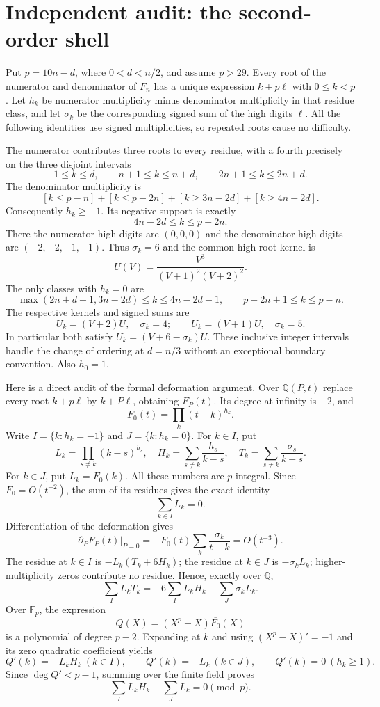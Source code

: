 \section*{Independent audit: the second-order shell}
Put $p=10n-d$, where $0<d<n/2$, and assume $p>29$.
Every root of the numerator and denominator of $F_n$ has a unique
expression $k+p\ell$ with $0\leq k<p$.  Let $h_k$ be numerator
multiplicity minus denominator multiplicity in that residue class, and
let $\sigma_k$ be the corresponding signed sum of the high digits $\ell$.
All the following identities use signed multiplicities, so repeated roots
cause no difficulty.

The numerator contributes three roots to every residue, with a fourth
precisely on the three disjoint intervals
\[
 1\leq k\leq d,\qquad n+1\leq k\leq n+d,
 \qquad 2n+1\leq k\leq2n+d.
\]
The denominator multiplicity is
\[
 [k\leq p-n]+[k\leq p-2n]
 +[k\geq3n-2d]+[k\geq4n-2d].
\]
Consequently $h_k\geq-1$.  Its negative support is exactly
\[
 4n-2d\leq k\leq p-2n.
\]
There the numerator high digits are $(0,0,0)$ and the denominator high
digits are $(-2,-2,-1,-1)$.  Thus $\sigma_k=6$ and the common high-root
kernel is
\[
 U(V)=\frac{V^3}{(V+1)^2(V+2)^2}.
\]
The only classes with $h_k=0$ are
\[
 \max(2n+d+1,3n-2d)\leq k\leq4n-2d-1,
 \qquad p-2n+1\leq k\leq p-n.
\]
The respective kernels and signed sums are
\[
 U_k=(V+2)U,\quad\sigma_k=4;
 \qquad U_k=(V+1)U,\quad\sigma_k=5.
\]
In particular both satisfy $U_k=(V+6-\sigma_k)U$.
These inclusive integer intervals handle the change of ordering at
$d=n/3$ without an exceptional boundary convention.  Also $h_0=1$.

Here is a direct audit of the formal deformation argument.  Over
$\mathbb Q(P,t)$ replace every root $k+p\ell$ by $k+P\ell$, obtaining
$F_P(t)$. Its degree at infinity is $-2$, and
\[
 F_0(t)=\prod_k(t-k)^{h_k}.
\]
Write $I=\{k:h_k=-1\}$ and $J=\{k:h_k=0\}$.  For $k\in I$, put
\[
 L_k=\prod_{s\ne k}(k-s)^{h_s},\quad
 H_k=\sum_{s\ne k}\frac{h_s}{k-s},\quad
 T_k=\sum_{s\ne k}\frac{\sigma_s}{k-s}.
\]
For $k\in J$, put $L_k=F_0(k)$. All these numbers are $p$-integral.
Since $F_0=O(t^{-2})$, the sum of its residues gives the exact identity
\[
 \sum_{k\in I}L_k=0.
\]
Differentiation of the deformation gives
\[
 \left.\partial_PF_P(t)\right|_{P=0}
 =-F_0(t)\sum_k\frac{\sigma_k}{t-k}=O(t^{-3}).
\]
The residue at $k\in I$ is $-L_k(T_k+6H_k)$; the residue at $k\in J$
is $-\sigma_kL_k$; higher-multiplicity zeros contribute no residue.
Hence, exactly over $\mathbb Q$,
\[
 \sum_{I}L_kT_k=-6\sum_{I}L_kH_k-\sum_J\sigma_kL_k. \tag{1}
\]
Over $\mathbb F_p$, the expression
\[
 Q(X)=(X^p-X)\overline{F_0}(X)
\]
is a polynomial of degree $p-2$.  Expanding at $k$ and using
$(X^p-X)'=-1$ and its zero quadratic coefficient yields
\[
 Q'(k)=-L_kH_k\ (k\in I),\qquad
 Q'(k)=-L_k\ (k\in J),\qquad Q'(k)=0\ (h_k\geq1).
\]
Since $\deg Q'<p-1$, summing over the finite field proves
\[
 \sum_I L_kH_k+\sum_JL_k=0\pmod p. \tag{2}
\]

